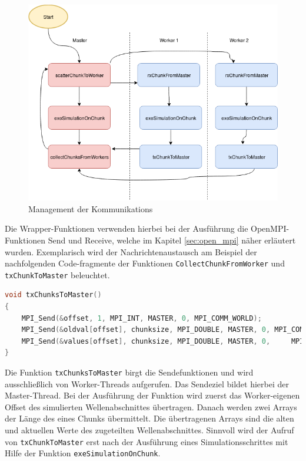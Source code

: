 \begin{figure}[H]
	\centering
	\includegraphics[width=1\textwidth]{pictures/MessagePassingManagement.png}
	\caption{Management der Kommunikations}
	\label{fig:ManagementMessages}
\end{figure}

Die Wrapper-Funktionen verwenden hierbei bei der Ausführung die OpenMPI-Funktionen Send und Receive, welche im Kapitel \ref{sec:open_mpi} näher erläutert wurden. Exemplarisch wird der Nachrichtenaustausch am Beispiel der nachfolgenden Code-fragmente der Funktionen \texttt{CollectChunkFromWorker} und \texttt{txChunkToMaster} beleuchtet.

\begin{lstlisting}[language=C]
void txChunksToMaster()
{
	MPI_Send(&offset, 1, MPI_INT, MASTER, 0, MPI_COMM_WORLD);
	MPI_Send(&oldval[offset], chunksize, MPI_DOUBLE, MASTER, 0, MPI_COMM_WORLD);
	MPI_Send(&values[offset], chunksize, MPI_DOUBLE, MASTER, 0, 	MPI_COMM_WORLD);
}
\end{lstlisting}

Die Funktion \texttt{txChunksToMaster} birgt die Sendefunktionen und wird ausschließlich von Worker-Threads aufgerufen. Das Sendeziel bildet hierbei der Master-Thread. Bei der Ausführung der Funktion wird zuerst das Worker-eigenen Offset des simulierten Wellenabschnittes übertragen. Danach werden zwei Arrays der Länge des eines Chunks übermittelt. Die übertragenen Arrays sind die alten und aktuellen Werte des zugeteilten Wellenabschnittes. Sinnvoll wird der Aufruf von \texttt{txChunkToMaster} erst nach der Ausführung eines Simulationsschrittes mit Hilfe der Funktion \texttt{exeSimulationOnChunk}.   

